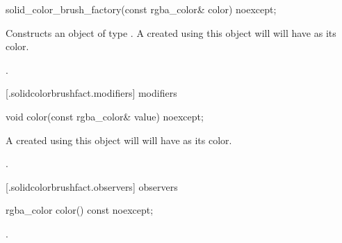 \begin{itemdecl}
    solid_color_brush_factory(const rgba_color& color) noexcept;
\end{itemdecl}
\begin{itemdescr}
	\pnum
	\effects
	Constructs an object of type . A  created using this object will will have  as its color.
	
	\pnum
	\postcondition
	.
		
\end{itemdescr}

 [\iotwod.solidcolorbrushfact.modifiers] { modifiers}

\begin{itemdecl}
    void color(const rgba_color& value) noexcept;
\end{itemdecl}
\begin{itemdescr}
	\pnum
	\effects
	A  created using this object will will have  as its color.
	
	\pnum
	\postcondition
	.
	
\end{itemdescr}

 [\iotwod.solidcolorbrushfact.observers] { observers}

\begin{itemdecl}
    rgba_color color() const noexcept;
\end{itemdecl}
\begin{itemdescr}
	\pnum
	\returns
	.

\end{itemdescr}
